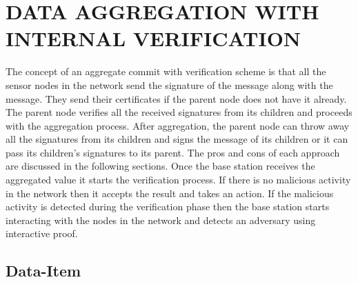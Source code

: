 \chapter{DATA AGGREGATION WITH INTERNAL VERIFICATION} %
\label{cha:Data Aggregation With Internal Verification}

	The concept of an aggregate commit with verification scheme is that all the sensor nodes in the network send the signature of the message along with the message.
	They send their certificates if the parent node does not have it already.
	The parent node verifies all the received signatures from its children and proceeds with the aggregation process.
	After aggregation, the parent node can throw away all the signatures from its children and signs the message of its children or it can pass its children's signatures to its parent. 
	The pros and cons of each approach are discussed in the following sections. 
	Once the base station receives the aggregated value it starts the verification process. 
	If there is no malicious activity in the network then  it accepts the result and takes an action.
	If the malicious activity is detected during the verification phase then the base station starts interacting with the nodes in the network and detects an adversary using interactive proof. 

\section{Data-Item}
	
